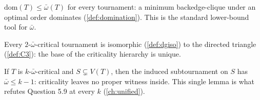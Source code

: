 


\begin{decoded}
$\mathrm{dom}(T) \le \bar\omega(T)$ for every tournament: a minimum
backedge-clique under an optimal order dominates
(\cref{def:domination}). This is the standard lower-bound tool for
$\bar\omega$.
\end{decoded}






\begin{decoded}
Every $2$-$\bar\omega$-critical tournament is isomorphic
(\cref{def:dgiso}) to the directed triangle (\cref{def:C3}): the
base of the criticality hierarchy is unique.
\end{decoded}






\begin{decoded}
If $T$ is $k$-$\bar\omega$-critical and $S \subsetneq V(T)$, then the
induced subtournament on $S$ has $\bar\omega \le k - 1$: criticality
leaves no proper witness inside. This single lemma is what refutes
Question 5.9 at every $k$ (\cref{ch:unified}).
\end{decoded}


